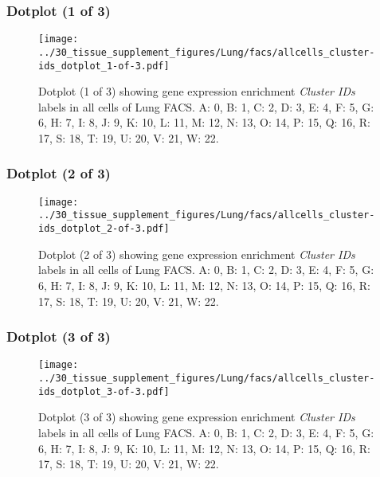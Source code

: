 \clearpage

\subsubsection{Dotplot (1 of 3)}
\begin{figure}[h]
\centering
\texttt{[image: ../30\_tissue\_supplement\_figures/Lung/facs/allcells\_cluster-ids\_dotplot\_1-of-3.pdf]}

\caption{ Dotplot (1 of 3)  showing gene expression enrichment \emph{Cluster IDs} labels in all cells of Lung FACS. A: 0, B: 1, C: 2, D: 3, E: 4, F: 5, G: 6, H: 7, I: 8, J: 9, K: 10, L: 11, M: 12, N: 13, O: 14, P: 15, Q: 16, R: 17, S: 18, T: 19, U: 20, V: 21, W: 22.}
\end{figure}


\clearpage

\subsubsection{Dotplot (2 of 3)}
\begin{figure}[h]
\centering
\texttt{[image: ../30\_tissue\_supplement\_figures/Lung/facs/allcells\_cluster-ids\_dotplot\_2-of-3.pdf]}

\caption{ Dotplot (2 of 3)  showing gene expression enrichment \emph{Cluster IDs} labels in all cells of Lung FACS. A: 0, B: 1, C: 2, D: 3, E: 4, F: 5, G: 6, H: 7, I: 8, J: 9, K: 10, L: 11, M: 12, N: 13, O: 14, P: 15, Q: 16, R: 17, S: 18, T: 19, U: 20, V: 21, W: 22.}
\end{figure}


\clearpage

\subsubsection{Dotplot (3 of 3)}
\begin{figure}[h]
\centering
\texttt{[image: ../30\_tissue\_supplement\_figures/Lung/facs/allcells\_cluster-ids\_dotplot\_3-of-3.pdf]}

\caption{ Dotplot (3 of 3)  showing gene expression enrichment \emph{Cluster IDs} labels in all cells of Lung FACS. A: 0, B: 1, C: 2, D: 3, E: 4, F: 5, G: 6, H: 7, I: 8, J: 9, K: 10, L: 11, M: 12, N: 13, O: 14, P: 15, Q: 16, R: 17, S: 18, T: 19, U: 20, V: 21, W: 22.}
\end{figure}


\clearpage

